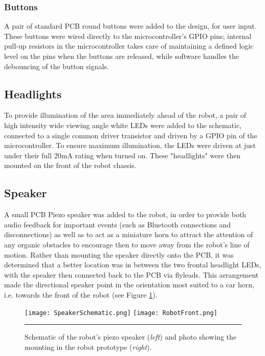 \FloatBarrier
\subsubsection{Buttons}

A pair of standard PCB round buttons were added to the design, for user input. These buttons were wired directly to the microcontroller's GPIO pins; internal pull-up resistors in the microcontroller takes care of maintaining a defined logic level on the pins when the buttons are released, while software handles the debouncing of the button signals.

\FloatBarrier
\subsection{Headlights}

To provide illumination of the area immediately ahead of the robot, a pair of high intensity wide viewing angle white LEDs were added to the schematic, connected to a single common driver transistor and driven by a GPIO pin of the microcontroller. To ensure maximum illumination, the LEDs were driven at just under their full 20mA rating when turned on. These "headlights" were then mounted on the front of the robot chassis.

\FloatBarrier
\subsection{Speaker}

A small PCB Piezo speaker was added to the robot, in order to provide both audio feedback for important events (such as Bluetooth connections and disconnections) as well as to act as a miniature horn to attract the attention of any organic obstacles to encourage then to move away from the robot's line of motion. Rather than mounting the speaker directly onto the PCB, it was determined that a better location was in between the two frontal headlight LEDs, with the speaker then connected back to the PCB via flyleads. This arrangement made the directional speaker point in the orientation most suited to a car horn, i.e. towards the front of the robot (see Figure \ref{fig:robotspeaker}).

\begin{figure}[tbph]
	\centering
		\texttt{[image: SpeakerSchematic.png]}
		\texttt{[image: RobotFront.png]}
	\rule{35em}{0.5pt}
	\caption[Speaker Schematic and Mounting Photo]{Schematic of the robot's piezo speaker (\textit{left}) and photo showing the mounting in the robot prototype (\textit{right}).}
	\label{fig:robotspeaker}
\end{figure}

